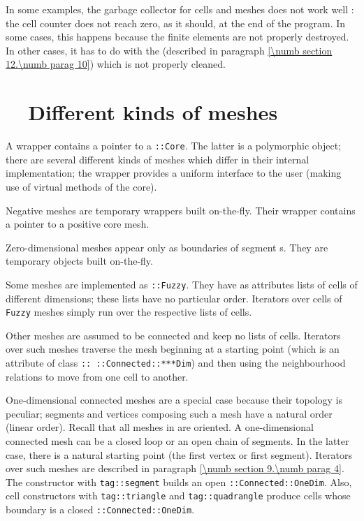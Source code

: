 In some examples, the garbage collector for cells and meshes does not work well :
the cell counter does not reach zero, as it should, at the end of the program.
In some cases, this happens because the finite elements are not properly destroyed.
In other cases, it has to do with the {\small\tt{}} (described in
paragraph \ref{\numb section 12.\numb parag 10}) which is not properly cleaned.


\section{~~Different kinds of meshes}\label{\numb section 11.\numb parag 6}   

A {\small\tt {}} wrapper contains a pointer to a {\small\tt {}::Core}.
The latter is a polymorphic object; there are several different kinds of meshes
which differ in their internal implementation; the wrapper provides a uniform interface
to the user (making use of virtual methods of the core).

Negative meshes are temporary wrappers built on-the-fly.
Their wrapper contains a pointer to a positive core mesh.

Zero-dimensional meshes appear only as boundaries of segment {\small\tt {}}s.
They are temporary objects built on-the-fly.

Some meshes are implemented as {\small\tt {}::Fuzzy}.
They have as attributes lists of cells of different dimensions;
these lists have no particular order.
Iterators over cells of {\small\tt Fuzzy} meshes simply run over the respective lists of cells.

Other meshes are assumed to be connected and keep no lists of cells.
Iterators over such meshes traverse the mesh beginning at a starting point (which is an attribute
of class {\small\tt {}:: ::Connected::***Dim}) and then using the neighbourhood relations
to move from one cell to another.

One-dimensional connected meshes are a special case because their topology is peculiar;
segments and vertices composing such a mesh have a natural order (linear order).
Recall that all meshes in {\maniFEM} are oriented.
A one-dimensional connected mesh can be a closed loop or an open chain of segments.
In the latter case, there is a natural starting point (the first vertex or first segment).
Iterators over such meshes are described in paragraph \ref{\numb section 9.\numb parag 4}.
The {\small\tt {}} constructor with {\small\tt \textcolor{tag}{tag}::segment} builds an open
{\small\tt {}::Connected::OneDim}.
Also, cell constructors with {\small\tt \textcolor{tag}{tag}::triangle} and {\small\tt \textcolor{tag}{tag}::quadrangle} produce cells
whose boundary is a closed {\small\tt {}::Connected::OneDim}.

